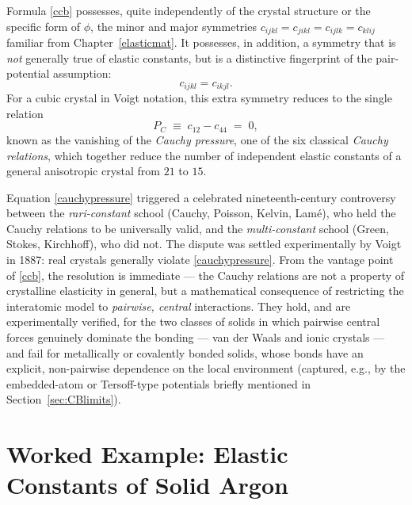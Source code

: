 \begin{remark}\label{rem:cauchyrel}
	Formula \eqref{ccb} possesses, quite independently of the crystal structure or the specific form of $\phi$, the minor and major symmetries $c_{ijkl}=c_{jikl}=c_{ijlk}=c_{klij}$ familiar from Chapter~\ref{elasticmat}. It possesses, in addition, a symmetry that is \textit{not} generally true of elastic constants, but is a distinctive fingerprint of the pair-potential assumption:
	\begin{equation}
		c_{ijkl} = c_{ikjl}.
	\end{equation}
	For a cubic crystal in Voigt notation, this extra symmetry reduces to the single relation
	\begin{equation}\label{cauchypressure}
		P_C \;\equiv\; c_{12}-c_{44} \;=\;0,
	\end{equation}
	known as the vanishing of the \textit{Cauchy pressure}, one of the six classical \textit{Cauchy relations}, which together reduce the number of independent elastic constants of a general anisotropic crystal from $21$ to $15$.

	Equation \eqref{cauchypressure} triggered a celebrated nineteenth-century controversy between the \textit{rari-constant} school (Cauchy, Poisson, Kelvin, Lam\'e), who held the Cauchy relations to be universally valid, and the \textit{multi-constant} school (Green, Stokes, Kirchhoff), who did not. The dispute was settled experimentally by Voigt in 1887: real crystals generally violate \eqref{cauchypressure}. From the vantage point of \eqref{ccb}, the resolution is immediate --- the Cauchy relations are not a property of crystalline elasticity in general, but a mathematical consequence of restricting the interatomic model to \textit{pairwise, central} interactions. They hold, and are experimentally verified, for the two classes of solids in which pairwise central forces genuinely dominate the bonding --- van der Waals and ionic crystals --- and fail for metallically or covalently bonded solids, whose bonds have an explicit, non-pairwise dependence on the local environment (captured, e.g., by the embedded-atom or Tersoff-type potentials briefly mentioned in Section~\ref{sec:CBlimits}).
\end{remark}

\section{Worked Example: Elastic Constants of Solid Argon}\label{sec:argonexample}

